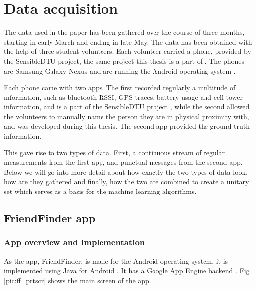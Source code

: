 \chapter{Data acquisition}

The data used in the paper has been gathered over the course of three months, starting in early March and ending in late May. The data has been obtained with the help of three student volunteers. Each volunteer carried a phone, provided by the SensibleDTU project, the same project this thesis is a part of \cite{sensibledtu, Stopczynski}. The phones are Samsung Galaxy Nexus \cite{nexus} and are running the Android operating system \cite{android}. 

Each phone came with two apps. The first recorded regularly a multitude of information, such as bluetooth RSSI, GPS traces, battery usage and cell tower information, and is a part of the SensibleDTU project \cite{Stopczynski}, while the second allowed the volunteers to manually name the person they are in physical proximity with, and was developed during this thesis. The second app provided the ground-truth information.

This gave rise to two types of data. First, a continuous stream of regular measurements from the first app, and punctual messages from the second app. Below we will go into more detail about how exactly the two types of data look, how are they gathered and finally, how the two are combined to create a unitary set which serves as a basis for the machine learning algorithms.

\section{FriendFinder app}

\subsection{App overview and implementation}

As the app, FriendFinder, is made for the Android operating system, it is implemented using Java for Android \cite{jandroid}. It has a Google App Engine backend \cite{googleapp}. Fig \ref{pic:ff_prtscr} shows the main screen of the app. 


